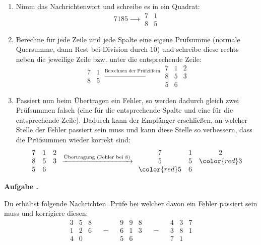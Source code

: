 \documentclass[a4paper,ngerman,12pt]{scrartcl}
\theoremstyle{definition}
\theoremstyle{plain}
\theoremstyle{remark}
\newlength{\aufgabenskip}
\newcounter{aufgabennummer}
\newenvironment{aufgabe}[1]{
	\addtocounter{aufgabennummer}{1}
	\textbf{Aufgabe \theaufgabennummer.} \emph{#1} \par
}{\vspace{\aufgabenskip}}
\begin{document}
\begin{enumerate}
	\item Nimm das Nachrichtenwort und schreibe es in ein Quadrat:
		\[7185 \xrightarrow{\hspace{2em}} \begin{array}{cc}7 & 1 \\8 & 5\end{array}\]
	\item Berechne für jede Zeile und jede Spalte eine eigene Prüfsumme (normale Quersumme, dann Rest bei Division durch $10$) und schreibe diese rechts neben die jeweilige Zeile bzw. unter die entsprechende Zeile:
		\[\begin{array}{cc}7 & 1 \\8 & 5\end{array} \xrightarrow{\text{Berechnen der Prüfziffern}} \begin{array}{ccc}7 & 1 & 2\\8 & 5 & 3 \\ 5 & 6 &\end{array}\]
	\item Passiert nun beim Übertragen ein Fehler, so werden dadurch gleich zwei Prüfsummen falsch (eine für die entsprechende Spalte und eine für die entsprechende Zeile). Dadurch kann der Empfänger erschließen, an welcher Stelle der Fehler passiert sein muss und kann diese Stelle so verbessern, dass die Prüfsummen wieder korrekt sind:
		\[\begin{array}{ccc}7 & 1 & 2\\8 & 5 & 3 \\ 5 & 6 &\end{array} \xrightarrow{\text{Übertragung (Fehler bei 8)}} \begin{array}{ccc}7 & 1 & 2\\5 & 5 & {\color{red}3} \\ {\color{red}5} & 6 &\end{array}\]
\end{enumerate}

\begin{aufgabe}{}
	Du erhältst folgende Nachrichten. Prüfe bei welcher davon ein Fehler passiert sein muss und korrigiere diesen:
		\[\begin{array}{ccc}3 & 5 & 8\\1 & 2 & 6 \\ 4 & 0 &\end{array} \quad-\quad \begin{array}{ccc}9 & 9 & 8\\6 & 1 & 3 \\ 5 & 6 &\end{array} \quad-\quad \begin{array}{ccc}4 & 3 & 7\\3 & 8 & 1 \\ 7 & 1 &\end{array}\]
\end{aufgabe}
\end{document}
